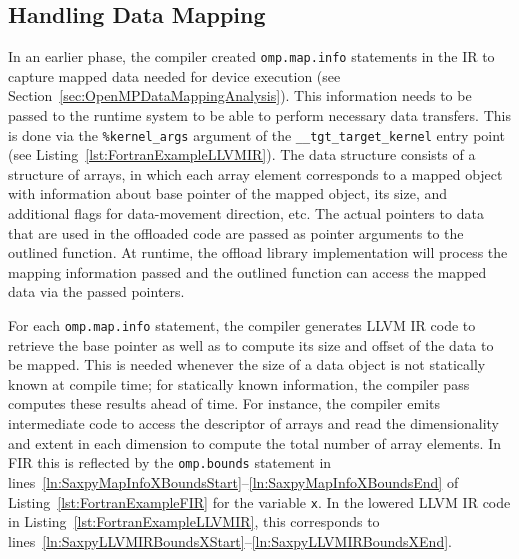 \documentclass[acmtog,natbib=false]{acmart}
\newcommand{\code}[1]{\texttt{#1}\xspace}
\begin{document}
\subsection{Handling Data Mapping}
\label{sec:HandlingDataMapping}


In an earlier phase, the compiler created \code{omp.map.info} statements in the \ac{IR} to capture mapped data needed for device execution (see Section~\ref{sec:OpenMPDataMappingAnalysis}).
This information needs to be passed to the runtime system to be able to perform necessary data transfers.
This is done via the \code{\%kernel\_args} argument of the \code{\_\_tgt\_target\_kernel} entry point (see Listing~\ref{lst:FortranExampleLLVMIR}).
The data structure consists of a structure of arrays, in which each array element corresponds to a mapped object with information about base pointer of the mapped object, its size, and additional flags for data-movement direction, etc.
The actual pointers to data that are used in the offloaded code are passed as pointer arguments to the outlined function.
At runtime, the offload library implementation will process the mapping information passed and the outlined function can access the mapped data via the passed pointers.



For each \code{omp.map.info} statement, the compiler generates LLVM \ac{IR} code to retrieve the base pointer as well as to compute its size and offset of the data to be mapped.
This is needed whenever the size of a data object is not statically known at compile time; for statically known information, the compiler pass computes these results ahead of time.
For instance, the compiler emits intermediate code to access the descriptor of arrays and read the dimensionality and extent in each dimension to compute the total number of array elements.
In \ac{FIR} this is reflected by the \code{omp.bounds} statement in lines~\ref{ln:SaxpyMapInfoXBoundsStart}--\ref{ln:SaxpyMapInfoXBoundsEnd} of Listing~\ref{lst:FortranExampleFIR} for the variable \code{x}.
In the lowered LLVM \ac{IR} code in Listing~\ref{lst:FortranExampleLLVMIR}, this corresponds to lines~\ref{ln:SaxpyLLVMIRBoundsXStart}--\ref{ln:SaxpyLLVMIRBoundsXEnd}.
\end{document}
